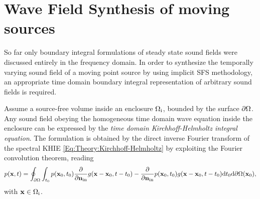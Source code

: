 \section{Wave Field Synthesis of moving sources}
\label{Sec:Moving_source_WFS}

So far only boundary integral formulations of steady state sound fields were discussed entirely in the frequency domain.
In order to synthesize the temporally varying sound field of a moving point source by using implicit SFS methodology, an appropriate time domain boundary integral representation of arbitrary sound fields is required.

Assume a source-free volume inside an enclosure $\Omega_{\mathrm{i}}$, bounded by the surface $\partial \Omega$.
Any sound field obeying the homogeneous time domain wave equation inside the enclosure can be expressed by the \emph{time domain Kirchhoff-Helmholtz integral equation}.
The formulation is obtained by the direct inverse Fourier transform of the spectral KHIE \eqref{Eq:Theory:Kirchhoff-Helmholtz} by exploiting the Fourier convolution theorem, reading
\begin{equation}
\small
p(\mathbf{x},t) = \oint_{\partial \Omega} \int_{t_0} p(\mathbf{x}_0,t_0) \frac{\partial}{\partial \mathbf{n}_{\mathrm{in}}} g(\mathbf{x} - \mathbf{x}_0, t - t_0) - \frac{\partial}{\partial \mathbf{n}_{\mathrm{in}}}  p(\mathbf{x}_0,t_0) g(\mathbf{x} - \mathbf{x}_0, t - t_0) \mathrm{d} t_0 \mathrm{d} \partial \Omega(\mathbf{x}_0),
\end{equation}
with $\mathbf{x} \in \Omega_{\mathrm{i}}$.	

